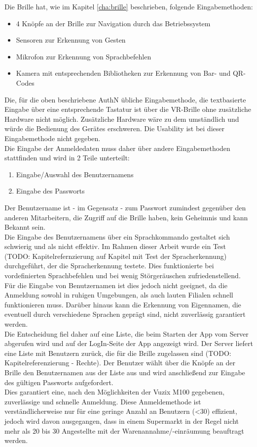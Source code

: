 Die Brille hat, wie im Kapitel \ref{cha:brille} beschrieben, folgende Eingabemethoden:
\begin{itemize}
	\item 4 Knöpfe an der Brille zur Navigation durch das Betriebssystem
	\item Sensoren zur Erkennung von Gesten
	\item Mikrofon zur Erkennung von Sprachbefehlen
	\item Kamera mit entsprechenden Bibliotheken zur Erkennung von Bar- und QR-Codes
\end{itemize}
Die, für die oben beschriebene \acf{AuthN} übliche Eingabemethode, die textbasierte Eingabe über eine entsprechende Tastatur ist über die \ac{VR}-Brille ohne zusätzliche Hardware nicht möglich. Zusätzliche Hardware wäre zu dem umständlich und würde die Bedienung des Gerätes erschweren. Die Usability ist bei dieser Eingabemethode nicht gegeben.\\

Die Eingabe der Anmeldedaten muss daher über andere Eingabemethoden stattfinden und wird in 2 Teile unterteilt:
\begin{enumerate}
	\item Eingabe/Auswahl des Benutzernamens
	\item Eingabe des Passworts
\end{enumerate}

Der Benutzername ist - im Gegensatz - zum Passwort zumindest gegenüber den anderen Mitarbeitern, die Zugriff auf die Brille haben, kein Geheimnis und kann Bekannt sein.\\
Die Eingabe des Benutzernamens über ein Sprachkommando gestaltet sich schwierig und als nicht effektiv. Im Rahmen dieser Arbeit wurde ein Test (TODO: Kapitelrefernzierung auf Kapitel mit Test der Spracherkennung) durchgeführt, der die Spracherkennung testete. Dies funktionierte bei vordefinierten Sprachbefehlen und bei wenig Störgeräuschen zufriedenstellend. Für die Eingabe von Benutzernamen ist dies jedoch nicht geeignet, da die Anmeldung sowohl in ruhigen Umgebungen, als auch lauten Filialen schnell funktionieren muss. Darüber hinaus kann die Erkennung von Eigennamen, die eventuell durch verschiedene Sprachen geprägt sind, nicht zuverlässig garantiert werden.\\
Die Entscheidung fiel daher auf eine Liste, die beim Starten der App vom Server abgerufen wird und auf der LogIn-Seite der App angezeigt wird. Der Server liefert eine Liste mit Benutzern zurück, die für die Brille zugelassen sind (TODO: Kapitelreferenzierung - Rechte). Der Benutzer wählt über die Knöpfe an der Brille den Benutzernamen aus der Liste aus und wird anschließend zur Eingabe des gültigen Passworts aufgefordert.\\
Dies garantiert eine, nach den Möglichkeiten der Vuzix M100 gegebenen, zuverlässige und schnelle Anmeldung. Diese Anmeldemethode ist verständlicherweise nur für eine geringe Anzahl an Benutzern (<30) effizient, jedoch wird davon ausgegangen, dass in einem Supermarkt in der Regel nicht mehr als 20 bis 30 Angestellte mit der Warenannahme/-einräumung beauftragt werden.\\


